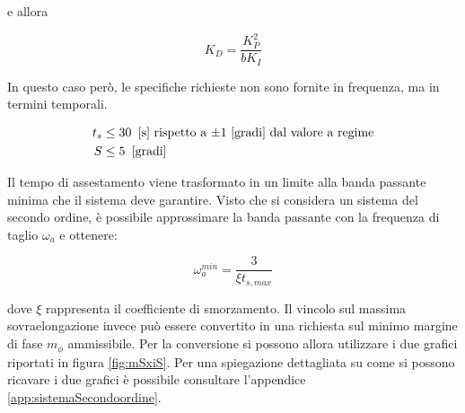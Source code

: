 		\noindent e allora
		
		\begin{equation}
			K_D=\frac{K_P^2}{bK_I}
		\end{equation}
		
		\noindent In questo caso però, le specifiche richieste non sono fornite in frequenza, ma in termini temporali. 
		
		\begin{align}
			t_s &\le 30 \singleSpacing \textrm{[s] rispetto a $\pm1$ [gradi] dal valore a regime} \\
			S   &\le 5 \singleSpacing \textrm{[gradi]}
		\end{align}
		
		\noindent Il tempo di assestamento viene trasformato in un limite alla banda passante minima che il sistema deve garantire. Visto che si considera un sistema del secondo ordine, è possibile approssimare la banda passante con la frequenza di taglio $\omega_a$ e ottenere:
		
		\begin{equation}
			\omega_a^{min}= \frac{3}{\xi t_{s,max}}
		\end{equation}
		
		\noindent dove $\xi$ rappresenta il coefficiente di smorzamento. Il vincolo sul massima sovraelongazione invece può essere convertito in una richiesta sul minimo margine di fase $m_{\phi}$ ammissibile. Per la conversione si possono allora utilizzare i due grafici riportati in figura \ref{fig:mSxiS}. Per una spiegazione dettagliata su come si possono ricavare i due grafici è possibile consultare l'appendice \ref{app:sistemaSecondoordine}.
		
